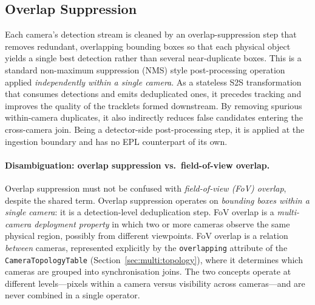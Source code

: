 \documentclass[review]{elsarticle}
\begin{document}
\subsection{Overlap Suppression}
\label{sec:single:overlap}
Each camera's detection stream is cleaned by an overlap-suppression step that removes redundant, overlapping bounding boxes so that each physical object yields a single best detection rather than several near-duplicate boxes. This is a standard non-maximum suppression (NMS) style post-processing operation~ applied \emph{independently within a single camera}. As a stateless S2S transformation that consumes detections and emits deduplicated ones, it precedes tracking and improves the quality of the tracklets formed downstream. By removing spurious within-camera duplicates, it also indirectly reduces false candidates entering the cross-camera join. Being a detector-side post-processing step, it is applied at the ingestion boundary and has no EPL counterpart of its own.

\paragraph{Disambiguation: overlap suppression vs.\ field-of-view overlap.}
Overlap suppression must not be confused with \emph{field-of-view (FoV) overlap}, despite the shared term. Overlap suppression operates on \emph{bounding boxes within a single camera}: it is a detection-level deduplication step. FoV overlap is a \emph{multi-camera deployment property} in which two or more cameras observe the same physical region, possibly from different viewpoints. FoV overlap is a relation \emph{between} cameras, represented explicitly by the \texttt{overlapping} attribute of the \texttt{CameraTopologyTable} (Section~\ref{sec:multi:topology}), where it determines which cameras are grouped into synchronisation joins. The two concepts operate at different levels---pixels within a camera versus visibility across cameras---and are never combined in a single operator.
\end{document}
